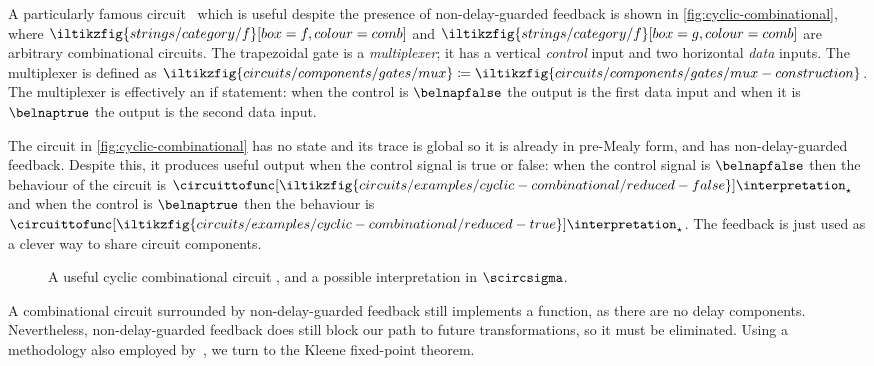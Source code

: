 \documentclass{lmcs}
\begin{document}
\begin{exa}\label{ex:cyclic-combinational}
    A particularly famous circuit~\cite{malik1994analysis} which is useful
    despite the presence of non-delay-guarded feedback is shown in
    \autoref{fig:cyclic-combinational}, where \(
    \iltikzfig{strings/category/f}[box=f,colour=comb]
    \) and \(
    \iltikzfig{strings/category/f}[box=g,colour=comb]
    \) are arbitrary combinational circuits.
    The trapezoidal gate is a \emph{multiplexer}; it has a vertical
    \emph{control} input and two horizontal \emph{data} inputs.
    The multiplexer is defined as \(
    \iltikzfig{circuits/components/gates/mux}
    \coloneqq
    \iltikzfig{circuits/components/gates/mux-construction}
    \).
    The multiplexer is effectively an if statement: when the control is
    \(\belnapfalse\) the output is the first data input and when it is
    \(\belnaptrue\) the output is the second data input.

    The circuit in \autoref{fig:cyclic-combinational} has no state and its trace is
    global so it is already in pre-Mealy form, and has
    non-delay-guarded feedback.
    Despite this, it produces useful output when the control signal is true or
    false:
    when the control signal is \(\belnapfalse\) then the behaviour of the
    circuit is \(
    \circuittofunc[
        \iltikzfig{circuits/examples/cyclic-combinational/reduced-false}
    ]{\interpretation_\star}
    \) and when the control is \(\belnaptrue\) then the behaviour is \(
    \circuittofunc[
        \iltikzfig{circuits/examples/cyclic-combinational/reduced-true}
    ]{\interpretation_\star}
    \).
    The feedback is just used as a clever way to share circuit components.
\end{exa}

\begin{figure}
    \centering
    \quad
    \caption{
        A useful cyclic combinational circuit
        \cite[Fig. 1]{mendler2012constructive}, and a possible interpretation in
        \(\scircsigma\).
    }
    \label{fig:cyclic-combinational}
\end{figure}

A combinational circuit surrounded by non-delay-guarded feedback still
implements a function, as there are no delay components.
Nevertheless, non-delay-guarded feedback does still block our path to future
transformations, so it must be eliminated.
Using a methodology also employed by~\cite{riedel2012cyclic}, we turn to the
Kleene fixed-point theorem.
\end{document}
